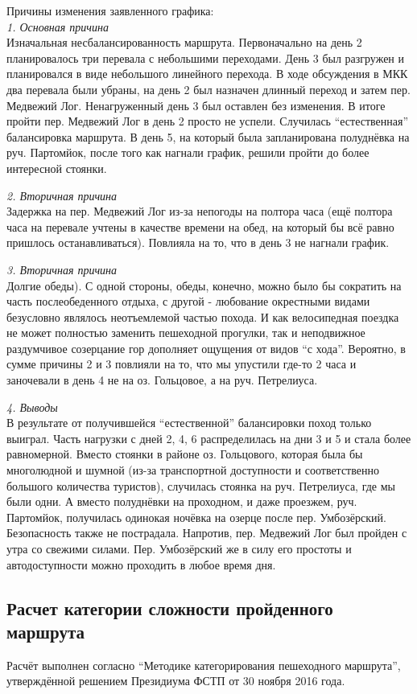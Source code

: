 Причины изменения заявленного графика:\\
\break
\textit{1. Основная причина}\\
Изначальная несбалансированность маршрута. Первоначально на день 2 планировалось три перевала с небольшими переходами.
День 3 был разгружен и планировался в виде небольшого линейного перехода.
В ходе обсуждения в МКК два перевала были убраны, на день 2 был назначен длинный переход и затем пер. Медвежий Лог.
Ненагруженный день 3 был оставлен без изменения. В итоге пройти пер. Медвежий Лог в день 2 просто не успели.
Случилась ``естественная'' балансировка маршрута.
В день 5, на который была запланирована полуднёвка на руч. Партомйок, после того как нагнали график,
решили пройти до более интересной стоянки.

\textit{2. Вторичная причина}\\
Задержка на пер. Медвежий Лог из-за непогоды на полтора часа (ещё полтора часа на перевале учтены в качестве времени на обед,
на который бы всё равно пришлось останавливаться).
Повлияла на то, что в день 3 не нагнали график.

\textit{3. Вторичная причина}\\
Долгие обеды). С одной стороны, обеды, конечно, можно было бы сократить на часть послеобеденного отдыха,
с другой - любование окрестными видами безусловно являлось неотъемлемой частью похода.
И как велосипедная поездка не может полностью заменить пешеходной прогулки, так и неподвижное раздумчивое созерцание гор
дополняет ощущения от видов ``с хода''.
Вероятно, в сумме причины 2 и 3 повлияли на то, что мы упустили где-то 2 часа и заночевали в день 4 не
на оз. Гольцовое, а на руч. Петрелиуса.

\textit{4. Выводы}\\
В результате от получившейся ``естественной'' балансировки поход только выиграл. Часть нагрузки с дней 2, 4, 6
распределилась на дни 3 и 5 и стала более равномерной. Вместо стоянки в районе оз. Гольцового,
которая была бы многолюдной и шумной (из-за транспортной доступности и соответственно большого количества туристов),
случилась стоянка на руч. Петрелиуса, где мы были одни. А вместо полуднёвки на проходном, и даже проезжем, руч. Партомйок,
получилась одинокая ночёвка на озерце после пер. Умбозёрский. Безопасность также не пострадала.
Напротив, пер. Медвежий Лог был пройден с утра со свежими силами. Пер. Умбозёрский же в силу его простоты и автодоступности
можно проходить в любое время дня.

\subsection{Расчет категории сложности пройденного маршрута}
Расчёт выполнен согласно ``Методике категорирования пешеходного маршрута'',
утверждённой решением Президиума ФСТП от 30 ноября 2016 года.

